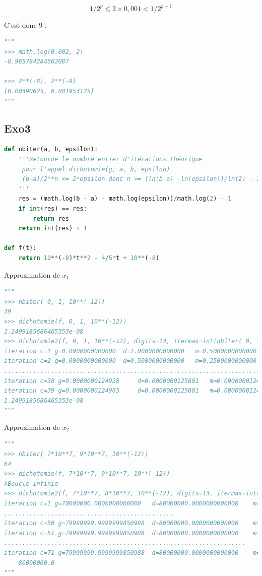 \documentclass[
  11pt,
]{article}
\newcounter{exo}
\newcounter{def}
\begin{document}
\[1/2^p \leqslant  2 \times 0,001 < 1/2^{p-1}\]

C'est donc 9 :

\begin{lstlisting}[language=Python]
"""
>>> math.log(0.002, 2)
-8.965784284662087

>>> 2**(-8), 2**(-9)
(0.00390625, 0.001953125)
"""
\end{lstlisting}

\hypertarget{exo3}{%
\subsection{Exo3}\label{exo3}}

\begin{lstlisting}[language=Python]
def nbiter(a, b, epsilon):
    '''Retourne le nombre entier d'itérations théorique
     pour l'appel dichotomie(g, a, b, epsilon)
     (b-a)/2**n <= 2*epsilon donc n >= (ln(b-a) -ln(epsilon))/ln(2) - 1
    '''
    res = (math.log(b - a) - math.log(epsilon))/math.log(2) - 1 
    if int(res) == res:
        return res
    return int(res) + 1

def f(t):
    return 10**(-8)*t**2 - 4/5*t + 10**(-8)
\end{lstlisting}

Approximation de \(x_1\)

\begin{lstlisting}[language=Python]
"""
>>> nbiter( 0, 1, 10**(-12))
39
>>> dichotomie(f, 0, 1, 10**(-12))
1.2499185686465353e-08
>>> dichotomie2(f, 0, 1, 10**(-12), digits=13, itermax=int(nbiter( 0, 1, 10**(-12))*1.1))
iteration c=1 g=0.0000000000000  d=1.0000000000000   m=0.5000000000000   f(m)=-0.3999999875000
iteration c=2 g=0.0000000000000  d=0.5000000000000   m=0.2500000000000   f(m)=-0.1999999893750
.........................................................................
iteration c=38 g=0.0000000124928     d=0.0000000125001   m=0.0000000124965   f(m)=0.0000000000028
iteration c=39 g=0.0000000124965     d=0.0000000125001   m=0.0000000124983   f(m)=0.0000000000014
1.2499185686465353e-08
"""
\end{lstlisting}

Approximation de \(x_2\)

\begin{lstlisting}[language=Python]
"""
>>> nbiter( 7*10**7, 9*10**7, 10**(-12))
64
>>> dichotomie(f, 7*10**7, 9*10**7, 10**(-12))
#Boucle infinie
>>> dichotomie2(f, 7*10**7, 8*10**7, 10**(-12), digits=13, itermax=int(nbiter( 7*10**7, 8*10**7, 10**(-12))*1.1))
iteration c=1 g=70000000.0000000000000   d=80000000.0000000000000    m=75000000.0000000000000    f(m)=-3749999.9999999902211
...............................................
iteration c=50 g=79999999.9999999850988  d=80000000.0000000000000    m=80000000.0000000000000    f(m)=0.0000000100000
iteration c=51 g=79999999.9999999850988  d=80000000.0000000000000    m=80000000.0000000000000    f(m)=0.0000000100000
...................................................................
iteration c=71 g=79999999.9999999850988  d=80000000.0000000000000    m=80000000.0000000000000    f(m)=0.0000000100000
    80000000.0
"""
\end{lstlisting}
\end{document}
